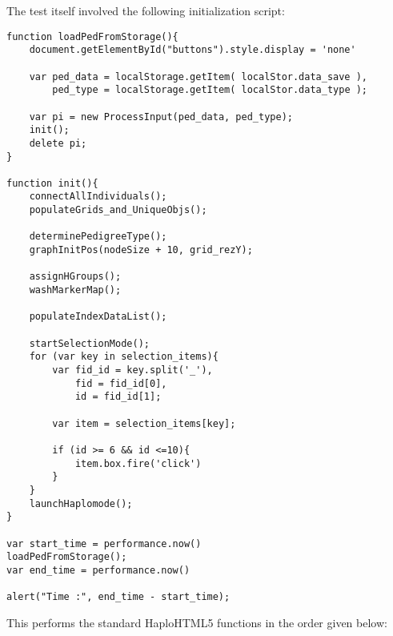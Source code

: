 \pagebreak
The test itself involved the following initialization script:

\begingroup
\begin{spacing}{1}
\begin{lstlisting}[label=code:inithaplo]
function loadPedFromStorage(){
	document.getElementById("buttons").style.display = 'none'

	var ped_data = localStorage.getItem( localStor.data_save ),
		ped_type = localStorage.getItem( localStor.data_type );

	var pi = new ProcessInput(ped_data, ped_type);
	init();
	delete pi;
}

function init(){
	connectAllIndividuals();
	populateGrids_and_UniqueObjs();

	determinePedigreeType();
	graphInitPos(nodeSize + 10, grid_rezY);

	assignHGroups();
	washMarkerMap();

	populateIndexDataList();

	startSelectionMode();
	for (var key in selection_items){
		var fid_id = key.split('_'),
			fid = fid_id[0],
			id = fid_id[1];

		var item = selection_items[key];

		if (id >= 6 && id <=10){
			item.box.fire('click')
		}
	}
	launchHaplomode();
}

var start_time = performance.now()
loadPedFromStorage();
var end_time = performance.now()

alert("Time :", end_time - start_time);
\end{lstlisting}
\vspace{-10pt}
\end{spacing}
\endgroup
\vspace{10pt}

This performs the standard HaploHTML5 functions in the order given below:

